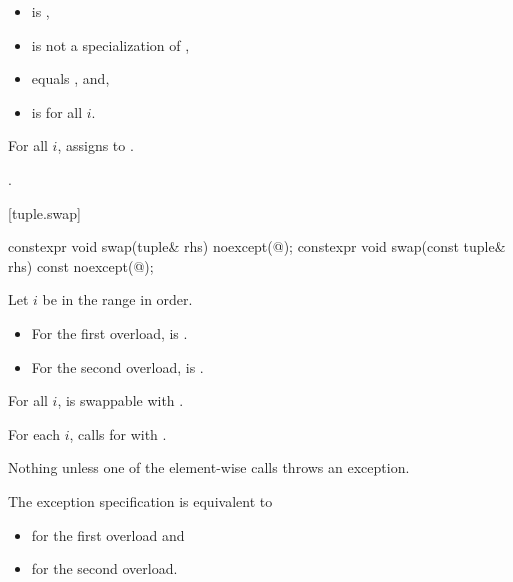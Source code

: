 \begin{itemdescr}
\pnum
\constraints
\begin{itemize}
\item
{}
is ,

\item
{}
is not a specialization of ,

\item
{}
equals , and,

\item
{}
is  for all $i$.
\end{itemize}

\pnum
\effects
For all $i$, assigns
 to .

\pnum
\returns
{}.
\end{itemdescr}

[tuple.swap]{}

%
\begin{itemdecl}
constexpr void swap(tuple& rhs) noexcept(@\seebelow@);
constexpr void swap(const tuple& rhs) const noexcept(@\seebelow@);
\end{itemdecl}

\begin{itemdescr}
\pnum
Let $i$ be in the range  in order.

\pnum
\mandates
\begin{itemize}
\item
For the first overload,
 is .
\item
For the second overload,
 is .
\end{itemize}

\pnum
\expects
For all $i$,  is swappable with .

\pnum
\effects
For each $i$, calls  for  with .

\pnum
\throws
Nothing unless one of the element-wise  calls throws an exception.

\pnum
\remarks
The exception specification is equivalent to
\begin{itemize}
\item
{} for the first overload and
\item
{} for the second overload.
\end{itemize}
\end{itemdescr}


